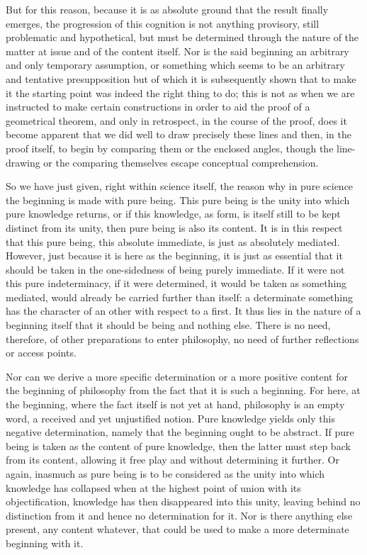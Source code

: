 But for this reason,
because it is as absolute ground
that the result finally emerges,
the progression of this cognition is not anything provisory,
still problematic and hypothetical,
but must be determined through the nature
of the matter at issue and of the content itself.
Nor is the said beginning an
arbitrary and only temporary assumption,
or something which seems to be an
arbitrary and tentative presupposition
but of which it is subsequently shown
that to make it the starting point
was indeed the right thing to do;
this is not as when we are instructed
to make certain constructions in order
to aid the proof of a geometrical theorem,
and only in retrospect, in the course of the proof,
does it become apparent that we did well to draw
precisely these lines and then, in the proof itself,
to begin by comparing them or the enclosed angles,
though the line-drawing or the comparing
themselves escape conceptual comprehension.

So we have just given, right within science itself,
the reason why in pure science
the beginning is made with pure being.
This pure being is the unity
into which pure knowledge returns,
or if this knowledge, as form,
is itself still to be kept
distinct from its unity,
then pure being is also its content.
It is in this respect that this pure being,
this absolute immediate, is just as absolutely mediated.
However, just because it is here as the beginning,
it is just as essential that it should be taken
in the one-sidedness of being purely immediate.
If it were not this pure indeterminacy,
if it were determined,
it would be taken as something mediated,
would already be carried further than itself:
a determinate something has the character of an other
with respect to a first.
It thus lies in the nature of a beginning itself
that it should be being and nothing else.
There is no need, therefore,
of other preparations to enter philosophy,
no need of further reflections or access points.

Nor can we derive a more specific determination
or a more positive content
for the beginning of philosophy
from the fact that it is such a beginning.
For here, at the beginning, where the fact
itself is not yet at hand,
philosophy is an empty word,
a received and yet unjustified notion.
Pure knowledge yields only this negative determination,
namely that the beginning ought to be abstract.
If pure being is taken as the content of pure knowledge,
then the latter must step back from its content,
allowing it free play and without determining it further.
Or again, inasmuch as pure being is to be considered
as the unity into which knowledge has collapsed
when at the highest point of union with its objectification,
knowledge has then disappeared into this unity,
leaving behind no distinction from it
and hence no determination for it.
Nor is there anything else present, any content whatever,
that could be used to make a more determinate beginning with it.

